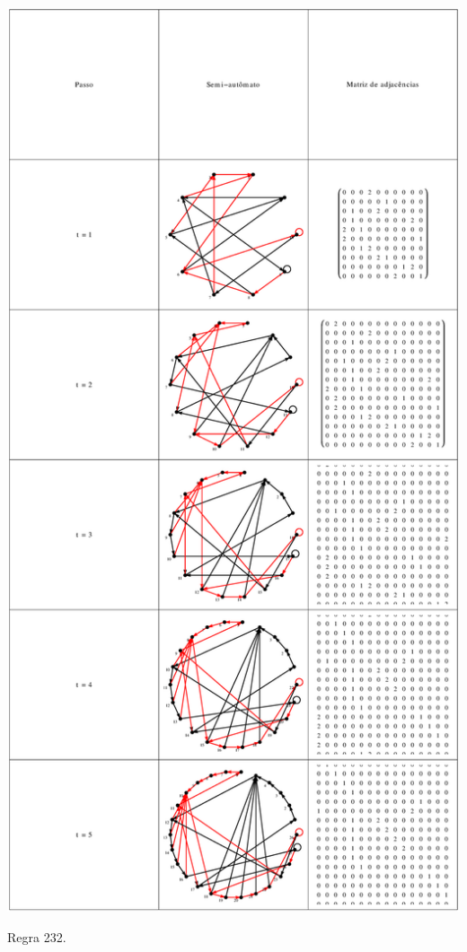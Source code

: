 \documentclass[12pt,a4paper]{article}
\begin{document}
\begin{table}[H]
\begin{center}
\includegraphics[scale=0.32]{img/mat/matr232.eps}
\caption{Regra 232.}
\label{tab:mr232}
\end{center}
\end{table}

\def\refname{Referências Bibliográficas}


\end{document}
